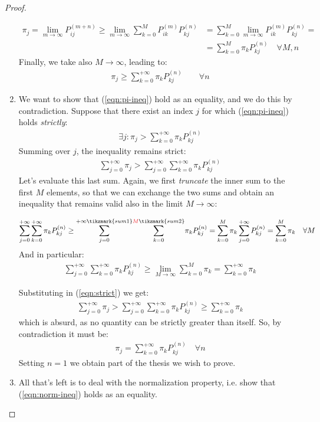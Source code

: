 \documentclass[../template.tex]{subfiles}
\begin{document}
\begin{proof}
\begin{enumerate}
\begin{align*}
            \pi_j = \lim_{m \to \infty} P_{ij}^{(m+n)} \geq \lim_{m \to \infty} \sum_{k=0}^M P_{ik}^{(m)} P_{kj}^{(n)} &= \sum_{k=0}^M \lim_{m \to \infty} P_{ik}^{(m)} P_{kj}^{(n)} =\\
            &= \sum_{k=0}^{M} \pi_k P_{kj}^{(n)} \quad \forall M,n
        \end{align*}
        Finally, we take also $M \to \infty$, leading to:
        \begin{align}\label{eqn:pi-ineq}
            \pi_j \geq \sum_{k=0}^{+\infty} \pi_k P_{kj}^{(n)} \qquad \forall n
        \end{align}
        \item
        We want to show that (\ref{eqn:pi-ineq}) hold as an equality, and we do this by contradiction. Suppose that there exist an index $j$ for which (\ref{eqn:pi-ineq}) holds \textit{strictly}:
        \begin{align*}
            \exists j \colon \pi_j > \sum_{k=0}^{+\infty} \pi_k P_{kj}^{(n)}
        \end{align*} 
        Summing over $j$, the inequality remains strict:
        \begin{align}\label{eqn:strict}
            \sum_{j=0}^{+\infty} \pi_j > \sum_{j=0}^{+\infty} \sum_{k=0}^{+\infty} \pi_k P_{kj}^{(n)}
        \end{align}
        Let's evaluate this last sum. Again, we first \textit{truncate} the inner sum to the first $M$ elements, so that we can exchange the two sums and obtain an inequality that remains valid also in the limit $M \to \infty$: 

        \begin{align*}
            \sum_{j=0}^{+\infty} \sum_{k=0}^{+\infty} \pi_k P_{kj}^{(n)} \geq 
            {\sum_{j=0}^{+\infty\tikzmark{sum1}}} {\sum_{k=0}^{\textcolor{Red}{M}\tikzmark{sum2}}} \pi_k P_{kj}^{(n)} = \sum_{k=0}^M \pi_k \sum_{j=0}^{+\infty} P_{kj}^{(n)} = \sum_{k=0}^M \pi_k \quad \forall M
        \end{align*}
        And in particular:
        \begin{align*}
            \sum_{j=0}^{+\infty} \sum_{k=0}^{+\infty} \pi_k P_{kj}^{(n)} \geq \lim_{M \to \infty} \sum_{k=0}^M \pi_k = \sum_{k=0}^{+\infty} \pi_k
        \end{align*}
        
        Substituting in (\ref{eqn:strict}) we get:
        \begin{align*}
            \sum_{j=0}^{+\infty} \pi_j > \sum_{j=0}^{+\infty} \sum_{k=0}^{+\infty} \pi_k P_{kj}^{(n)} \geq \sum_{k=0}^{+\infty} \pi_k
        \end{align*}
        which is absurd, as no quantity can be strictly greater than itself. So, by contradiction it must be:
        \begin{align*}
            \pi_j = \sum_{k=0}^{+\infty} \pi_k P_{kj}^{(n)} \quad \forall n
        \end{align*}
        Setting $n = 1$ we obtain part of the thesis we wish to prove.
        \item All that's left is to deal with the normalization property, i.e. show that (\ref{eqn:norm-ineq}) holds as an equality.


\end{enumerate}
\end{proof}
\end{document}
